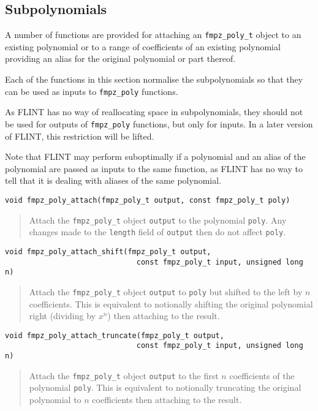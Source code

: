 \documentclass[a4paper,10pt]{article}
\newcommand{\code}{\lstinline}
\begin{document}
\subsection{Subpolynomials}
A number of functions are provided for attaching an \code{fmpz_poly_t} object to an existing polynomial or to a range of coefficients of an existing polynomial providing an alias for the original polynomial or part thereof. 

Each of the functions in this section normalise the subpolynomials so that they can be used as inputs to \code{fmpz_poly} functions. 

As FLINT has no way of reallocating space in subpolynomials, they should not be used for outputs of \code{fmpz_poly} functions, but only for inputs. In a later version of FLINT, this restriction will be lifted.

Note that FLINT may perform suboptimally if a polynomial and an alias of the polynomial are passed as inputs to the same function, as FLINT has no way to tell that it is dealing with aliases of the same polynomial.

\begin{lstlisting}
void fmpz_poly_attach(fmpz_poly_t output, const fmpz_poly_t poly)
\end{lstlisting}
\begin{quote}
Attach the \code{fmpz_poly_t} object \code{output} to the polynomial \code{poly}. Any changes made to the \code{length} field of \code{output} then do not affect \code{poly}.
\end{quote}

\begin{lstlisting}
void fmpz_poly_attach_shift(fmpz_poly_t output, 
                              const fmpz_poly_t input, unsigned long n)
\end{lstlisting}
\begin{quote}
Attach the \code{fmpz_poly_t} object \code{output} to \code{poly} but shifted to the left by $n$ coefficients. This is equivalent to notionally shifting the original polynomial right (dividing by $x^n$) then attaching to the result.
\end{quote}

\begin{lstlisting}
void fmpz_poly_attach_truncate(fmpz_poly_t output, 
                              const fmpz_poly_t input, unsigned long n)
\end{lstlisting}
\begin{quote}
Attach the \code{fmpz_poly_t} object \code{output} to the first $n$ coefficients of the polynomial \code{poly}. This is equivalent to notionally truncating the original polynomial to $n$ coefficients then attaching to the result.
\end{quote}
\end{document}
